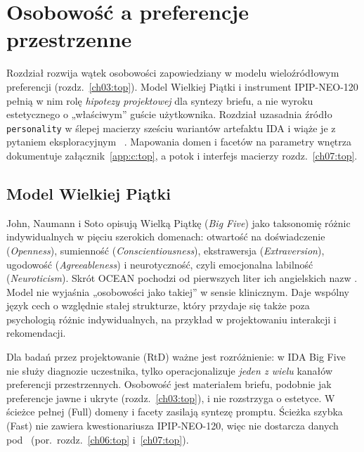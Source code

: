 \chapter{Osobowość a preferencje przestrzenne}
\label{ch05:top}

Rozdział rozwija wątek osobowości zapowiedziany w modelu wieloźródłowym preferencji (rozdz.~\ref{ch03:top}). Model Wielkiej Piątki i instrument IPIP-NEO-120 pełnią w nim rolę \emph{hipotezy projektowej} dla syntezy briefu, a nie wyroku estetycznego o „właściwym” guście użytkownika.
Rozdział uzasadnia źródło \texttt{personality} w ślepej macierzy sześciu wariantów artefaktu IDA i wiąże je z pytaniem eksploracyjnym~ \parencite{idaPlatform2026}.
Mapowania domen i facetów na parametry wnętrza dokumentuje załącznik~\ref{app:c:top}, a potok i interfejs macierzy rozdz.~\ref{ch07:top}.

\section{Model Wielkiej Piątki}
\label{ch05:sec:bigfive}

John, Naumann i Soto opisują Wielką Piątkę (\emph{Big Five}) jako taksonomię różnic indywidualnych w pięciu szerokich domenach: otwartość na doświadczenie (\emph{Openness}), sumienność (\emph{Conscientiousness}), ekstrawersja (\emph{Extraversion}), ugodowość (\emph{Agreeableness}) i neurotyczność, czyli emocjonalna labilność (\emph{Neuroticism}). Skrót OCEAN pochodzi od pierwszych liter ich angielskich nazw \parencite{john2008bigfive}.
Model nie wyjaśnia „osobowości jako takiej” w sensie klinicznym. Daje wspólny język cech o względnie stałej strukturze, który przydaje się także poza psychologią różnic indywidualnych, na przykład w projektowaniu interakcji i rekomendacji.

Dla badań przez projektowanie (RtD) ważne jest rozróżnienie: w IDA Big Five nie służy diagnozie uczestnika, tylko operacjonalizuje \emph{jeden z wielu} kanałów preferencji przestrzennych.
Osobowość jest materiałem briefu, podobnie jak preferencje jawne i ukryte (rozdz.~\ref{ch03:top}), i nie rozstrzyga o estetyce.
W ścieżce pełnej (Full) domeny i facety zasilają syntezę promptu. Ścieżka szybka (Fast) nie zawiera kwestionariusza IPIP-NEO-120, więc nie dostarcza danych pod~ (por.\ rozdz.~\ref{ch06:top} i~\ref{ch07:top}).


